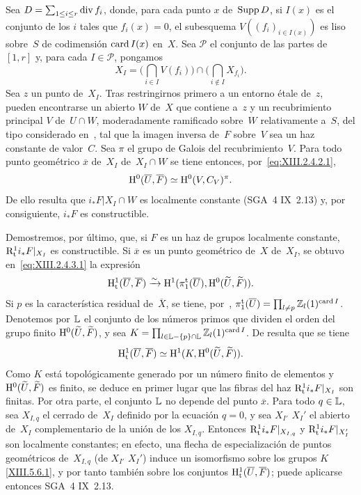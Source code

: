 Sea $D=\sum_{1\leq i\leq r}\operatorname{div} f_i$, donde, para cada punto
$x$ de~$\operatorname{Supp} D$, si $I(x)$ es el conjunto de los $i$ tales que
$f_i(x)=0$, el subesquema $V((f_i)_{i\in I(x)})$ es liso sobre~$S$ de
codimensión $\operatorname{card} I(x)$ en~$X$. Sea $\mathcal{P}$ el conjunto de las
partes de~$[ 1,r ]$ y, para cada $I\in\mathcal{P}$, pongamos
$$
X_I=\textstyle\Big(\bigcap_{i\in I}V(f_i)\Big)\cap\Big(\bigcap_{i\not\in I}X_{f_i}\Big).
$$
Sea
$z$ un punto de~$X_I$. Tras restringirnos primero a un entorno étale
de~$z$, pueden encontrarse un abierto $W$ de~$X$ que contiene a~$z$ y un
recubrimiento principal $V$ de~$U\cap W$, moderadamente ramificado
sobre~$W$ relativamente a~$S$, del tipo considerado
en~, tal que la imagen inversa de~$F$ sobre~$V$ sea
un haz constante de valor~$C$. Sea $\pi$ el grupo de Galois del
recubrimiento~$V$. Para todo punto geométrico $\overline{x}$
{de~$X_I$}
{de~$X_I\cap W$}
se tiene entonces, por~\eqref{eq:XIII.2.4.2.1},
$$
\mathrm H^0(\overline{U},\overline{F})\simeq \mathrm H^0(V,C_V)^{\pi}.
$$
De ello resulta que $i_*F|X_I\cap W$ es localmente constante
(SGA~4 IX~2.13) y, por consiguiente, $i_*F$ es constructible.

Demostremos, por último, que, si $F$ es un haz de grupos localmente
constante, $\mathrm{R}^1_{\mathrm{t}}i_*F|_{X_I}$ es constructible. Si
$\overline{x}$ es un punto geométrico
{de~$X$}
{de~$X_I$},
se obtuvo en~\eqref{eq:XIII.2.4.3.1} la expresión
$$
\mathrm H^1_{\mathrm{t}}(\overline{U},\overline{F})\xrightarrow{\sim}
\mathrm H^1(\pi^{\mathrm{t}}_1(\overline{U}),\mathrm H^0(\widetilde{U},\widetilde{F})).
$$
Si $p$ es la característica residual de~$\overline{X}$, se tiene,
por~,
$\pi_1^{\mathrm{t}}(\overline{U})=\prod_{l\neq p }\mathbb Z_l(1)^{\operatorname{card} I}$.
Denotemos por $\mathbb L$ el conjunto de los números primos que dividen el
orden del grupo finito $\mathrm H^0(\widetilde{U},\widetilde{F})$, y sea
$K=\prod_{l\in\mathbb L -\{p\}\cap\mathbb L }\mathbb Z_l(1)^{\operatorname{card} I}$. De
\cite[I \S5 ex.2]{XIII.4} resulta que se tiene
$$
\mathrm H^1_{\mathrm{t}}(\overline{U},\overline{F})\simeq
\mathrm H^1(K,\mathrm H^0(\widetilde{U},\widetilde{F})).
$$
Como $K$ está topológicamente generado por un número finito de elementos y
$\mathrm H^0(\widetilde{U},\widetilde{F})$ es finito, se deduce en primer lugar
que las fibras del haz $\mathrm{R}^1_{\mathrm{t}}i_*F|_{X_I}$ son finitas. Por otra
parte, el conjunto $\mathbb L$ no depende del punto $\overline{x}$. Para todo
$q\in\mathbb L$, sea $X_{I,q}$ el cerrado de~$X_I$ definido por la ecuación
$q=0$, y sea
{$X_{I'}$}
{$X_I'$}
el abierto de~$X_I$ complementario de la unión de los $X_{I,q}$. Entonces
$\mathrm{R}^1_{\mathrm{t}}i_*F|_{X_{I,q}}$ y $\mathrm{R}^1_{\mathrm{t}}i_*F|_{X_I'}$ son
localmente constantes; en efecto, una flecha de especialización de puntos
geométricos de~$X_{I,q}$ (\resp de
{$X_{I'}$}
{$X_I'$})
induce un isomorfismo sobre los grupos $K$ \eqref{XIII.5.6.1}, y por tanto
también sobre los conjuntos
$\mathrm H^1_{\mathrm{t}}(\overline{U},\overline{F})$; puede aplicarse entonces
SGA~4 IX~2.13.
\endgroup

